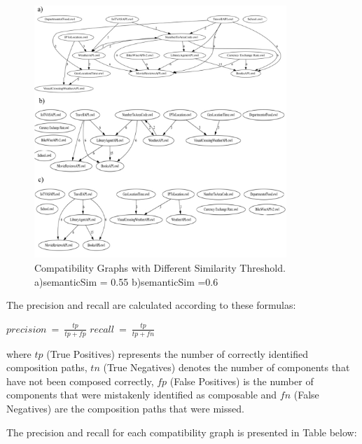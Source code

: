 \begin{figure}[hbt]
\hypertarget{fig:eval-sd-test}{%
\centering
\includegraphics[width=0.85\textwidth]{../figures/MyFigures/Compatibility graph.pdf}
\captionsetup{justification=centering}
\caption{Compatibility Graphs with Different Similarity Threshold. a)semanticSim = 0.55 b)semanticSim =0.6}\label{fig:eval-sd-test}
}
\end{figure}
\pagebreak
The precision and recall are calculated according to these formulas:

\(precision\  = \ \frac{tp}{tp + fp}\)
\(recall\  = \ \frac{tp}{tp + fn}\)

where \(tp\) (True Positives) represents the number of correctly
identified composition paths, \(tn\) (True Negatives) denotes the number
of components that have not been composed correctly, \(fp\) (False
Positives) is the number of components that were mistakenly identified
as composable and \(fn\) (False Negatives) are the composition paths
that were missed.

The precision and recall for each compatibility graph is presented in
Table below:

